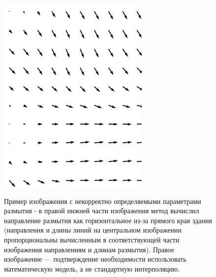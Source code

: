 \begin{figure} [H]
\begin{minipage}[h]{0.28\linewidth}
\includegraphics[width=1\linewidth, right]{pics/fields/vec.png} \\ 
\end{minipage}
\caption{Пример изображения с некорректно определяемыми параметрами размытия - в правой нижней части изображения метод вычислил направление размытия как горизонтальное из-за прямого края здания (направления и длины линий на центральном изображении пропорциональны вычисленным в соответствующей части изображения направлениям и длинам размытия). Правое изображение --- подтверждение необходимости использовать математическую модель, а не стандартную интерполяцию.}
\label{ris:bad_interpolation}
\end{figure}

